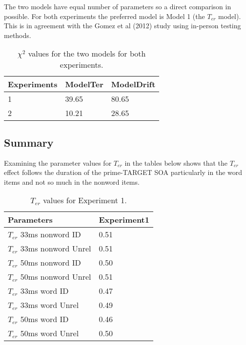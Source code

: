 \documentclass[
  english,
  man,floatsintext]{apa6}
\begin{document}
\begin{appendix}
The two models have equal number of parameters so a direct comparison in
possible. For both experiments the preferred model is Model 1 (the
\(T_{er}\) model). This is in agreement with the Gomez et al (2012)
study using in-person testing methods.

\begin{table}[tbp]

\begin{center}
\begin{threeparttable}

\caption{\label{tab:appendix_model_parameters_table}$\chi^2$ values for the two models for both experiments.}

\begin{tabular}{lll}
\toprule
Experiments & \multicolumn{1}{c}{ModelTer} & \multicolumn{1}{c}{ModelDrift}\\
\midrule
1 & 39.65 & 80.65\\
2 & 10.21 & 28.65\\
\bottomrule
\end{tabular}

\end{threeparttable}
\end{center}

\end{table}

\hypertarget{summary}{%
\subsection{Summary}\label{summary}}

Examining the parameter values for \(T_{er}\) in the tables below shows
that the \(T_{er}\) effect follows the duration of the prime-TARGET SOA
particularly in the word items and not so much in the nonword items.

\begin{table}[tbp]

\begin{center}
\begin{threeparttable}

\caption{\label{tab:appendix_table_2}$T_{er}$ values for Experiment 1.}

\begin{tabular}{ll}
\toprule
Parameters & \multicolumn{1}{c}{Experiment1}\\
\midrule
$T_{er}$  33ms nonword ID & 0.51\\
$T_{er}$ 33ms nonword Unrel & 0.51\\
$T_{er}$  50ms nonword ID & 0.50\\
$T_{er}$ 50ms nonword Unrel & 0.51\\
$T_{er}$  33ms word ID & 0.47\\
$T_{er}$ 33ms word Unrel & 0.49\\
$T_{er}$  50ms word ID & 0.46\\
$T_{er}$ 50ms word Unrel & 0.50\\
\bottomrule
\end{tabular}


\end{threeparttable}
\end{center}
\end{table}
\end{appendix}
\end{document}
